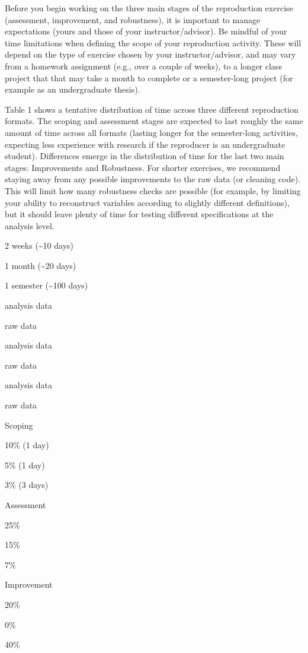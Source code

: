 \documentclass[]{book}
\begin{document}
Before you begin working on the three main stages of the reproduction exercise (assessment, improvement, and robustness), it is important to manage expectations (yours and those of your instructor/advisor). Be mindful of your time limitations when defining the scope of your reproduction activity. These will depend on the type of exercise chosen by your instructor/advisor, and may vary from a homework assignment (e.g., over a couple of weeks), to a longer class project that that may take a month to complete or a semester-long project (for example as an undergraduate thesis).

Table 1 shows a tentative distribution of time across three different reproduction formats. The scoping and assessment stages are expected to last roughly the same amount of time across all formats (lasting longer for the semester-long activities, expecting less experience with research if the reproducer is an undergraduate student). Differences emerge in the distribution of time for the last two main stages: Improvements and Robustness. For shorter exercises, we recommend staying away from any possible improvements to the raw data (or cleaning code). This will limit how many robustness checks are possible (for example, by limiting your ability to reconstruct variables according to slightly different definitions), but it should leave plenty of time for testing different specifications at the analysis level.

2 weeks (\textasciitilde{}10 days)

1 month (\textasciitilde{}20 days)

1 semester (\textasciitilde{}100 days)

analysis data

raw data

analysis data

raw data

analysis data

raw data

Scoping

10\% (1 day)

5\% (1 day)

3\% (3 days)

Assessment

25\%

15\%

7\%

Improvement

20\%

0\%

40\%
\end{document}
